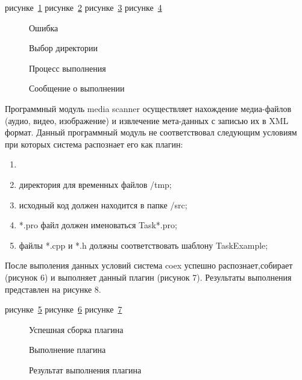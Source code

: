 рисунке~\ref{ship_2:ship_2}
рисунке~\ref{ship_3:ship_3}
рисунке~\ref{ship_4:ship_4}
рисунке~\ref{ship_5:ship_5}

\begin{figure}[h!]
\caption{ Ошибка }
\label{ship_2:ship_2}
\end{figure}

\begin{figure}[h!]
\caption{ Выбор директории }
\label{ship_3:ship_3}
\end{figure}

\begin{figure}[h!]
\caption{ Процесс выполнения }
\label{ship_4:ship_4}
\end{figure}

\begin{figure}[h!]
\caption{ Сообщение о выполнении }
\label{ship_5:ship_5}
\end{figure}


Программный модуль media scanner осуществляет нахождение медиа-файлов (аудио, видео, изображение) и извлечение мета-данных с записью их в XML формат. Данный программный модуль не соответствовал следующим условиям при которых система распознает его как плагин:
\begin{enumerate}
  \item 
  \item директория для временных файлов /tmp;
  \item исходный код должен находится в папке /src;
  \item *.pro файл должен именоваться Task*.pro;
  \item файлы *.cpp и *.h должны соответствовать шаблону TaskExample;
\end{enumerate}

После выполения данных условий система coex успешно распознает,собирает (рисунок 6) и выполняет данный плагин (рисунок 7). Результаты выполнения представлен на рисунке 8.


рисунке~\ref{ship_6:ship_6}
рисунке~\ref{ship_7:ship_7}
рисунке~\ref{ship_8:ship_8}

\begin{figure}[h!]
\caption{ Успешная сборка плагина }
\label{ship_6:ship_6}
\end{figure}

\begin{figure}[h!]
\caption{ Выполнение плагина }
\label{ship_7:ship_7}
\end{figure}

\begin{figure}[h!]
\caption{ Результат выполнения плагина }
\label{ship_8:ship_8}
\end{figure}

\clearpage










